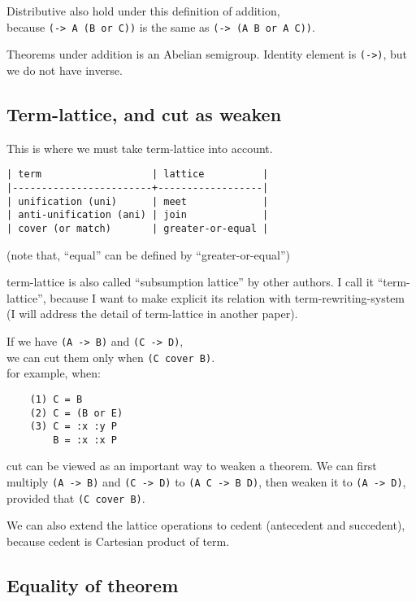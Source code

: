 \documentclass[numbers]{sigplanconf}
\begin{document}
Distributive also hold under this definition of addition, \\
because {\scriptsize\verb|(-> A (B or C))|} is the same as {\scriptsize\verb|(-> (A B or A C))|}.

Theorems under addition is an Abelian semigroup.
Identity element is {\scriptsize\verb|(->)|},
but we do not have inverse.

\subsection{Term-lattice, and cut as weaken}

This is where we must take term-lattice into account.

{\scriptsize\begin{verbatim}
| term                   | lattice          |
|------------------------+------------------|
| unification (uni)      | meet             |
| anti-unification (ani) | join             |
| cover (or match)       | greater-or-equal |
\end{verbatim}}

(note that, ``equal'' can be defined by ``greater-or-equal'')

term-lattice is also called ``subsumption lattice'' by other authors.
I call it ``term-lattice'',
because I want to make explicit its relation with term-rewriting-system
(I will address the detail of term-lattice in another paper).

If we have {\scriptsize\verb|(A -> B)|} and {\scriptsize\verb|(C -> D)|}, \\
we can cut them only when {\scriptsize\verb|(C cover B)|}. \\
for example, when:

{\scriptsize\begin{verbatim}
    (1) C = B
    (2) C = (B or E)
    (3) C = :x :y P
        B = :x :x P
\end{verbatim}}

cut can be viewed as an important way to weaken a theorem.
We can first multiply {\scriptsize\verb|(A -> B)|} and {\scriptsize\verb|(C -> D)|} to {\scriptsize\verb|(A C -> B D)|},
then weaken it to {\scriptsize\verb|(A -> D)|}, provided that {\scriptsize\verb|(C cover B)|}.

We can also extend the lattice operations to cedent (antecedent and succedent),
because cedent is Cartesian product of term.

\subsection{Equality of theorem}
\end{document}
